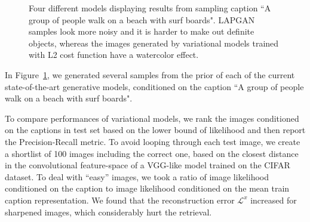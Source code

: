 \documentclass{article} %
\newcommand{\rloss}{\mathcal{L}^{x}}
\begin{document}
\vspace{-0.5cm}
\begin{figure}[!h]
\captionsetup[subfigure]{labelformat=empty}
\begin{center}
\quad
%
\quad
%
\quad
%
\quad
%
\end{center}
\caption{Four different models displaying results from sampling caption ``A group of people walk on a beach with surf boards". LAPGAN samples look more noisy and it is harder to make out definite objects, whereas the images generated by variational models trained with L2 cost function have a watercolor effect.}
\label{fig:diffmodels}
\vspace{-0.4cm}
\end{figure}

In Figure~\ref{fig:diffmodels}, we generated several samples from the prior of each of the current state-of-the-art generative models, conditioned on the caption ``A group of people walk on a beach with surf boards".

To compare performances of variational models, we rank the images conditioned on the captions in test set based on the lower bound of likelihood and then report the Precision-Recall metric. To avoid looping through each test image, we create a shortlist of 100 images including the correct one, based on the closest distance in the convolutional feature-space of a VGG-like model trained on the CIFAR dataset. To deal with ``easy'' images, we took a ratio of image likelihood conditioned on the caption to image likelihood conditioned on the mean train caption representation. We found that the reconstruction error $\rloss$ increased for sharpened images, which considerably hurt the retrieval.
\end{document}
